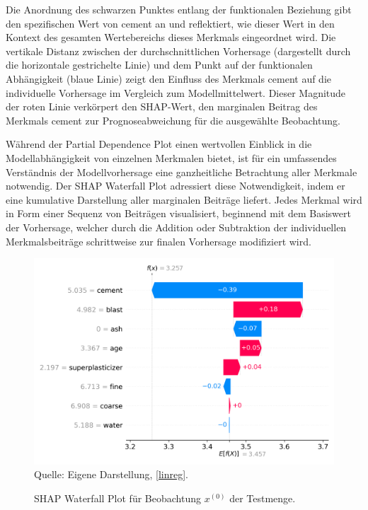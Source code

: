 Die Anordnung des schwarzen Punktes entlang der funktionalen Beziehung gibt den spezifischen Wert 
von cement an und reflektiert, wie dieser Wert in den Kontext des gesamten Wertebereichs dieses Merkmals 
eingeordnet wird. Die vertikale Distanz zwischen der durchschnittlichen Vorhersage (dargestellt durch die horizontale 
gestrichelte Linie) und dem Punkt auf der funktionalen Abhängigkeit (blaue Linie) zeigt den Einfluss des Merkmals 
cement auf die individuelle Vorhersage im Vergleich zum Modellmittelwert. Dieser Magnitude der roten Linie verkörpert den SHAP-Wert,
den marginalen Beitrag des Merkmals cement zur Prognoseabweichung für die ausgewählte Beobachtung.

Während der Partial Dependence Plot einen wertvollen Einblick in die Modellabhängigkeit von 
einzelnen Merkmalen bietet, ist für ein umfassendes Verständnis der Modellvorhersage eine ganzheitliche 
Betrachtung aller Merkmale notwendig. Der SHAP Waterfall Plot adressiert diese Notwendigkeit, 
indem er eine kumulative Darstellung aller marginalen Beiträge liefert. Jedes Merkmal wird in 
Form einer Sequenz von Beiträgen visualisiert, beginnend mit dem Basiswert der Vorhersage, welcher 
durch die Addition oder Subtraktion der individuellen Merkmalsbeiträge schrittweise zur finalen Vorhersage 
modifiziert wird.

\begin{figure}[!h]
    \caption{SHAP Waterfall Plot für Beobachtung $x^{(0)}$ der Testmenge.}
    \includegraphics[width=1\textwidth]{../scripts/images/shap_waterfall_plot.png}
    Quelle: Eigene Darstellung, \ref{linreg}.
    \label{pic:shap_waterfall}
\end{figure}

